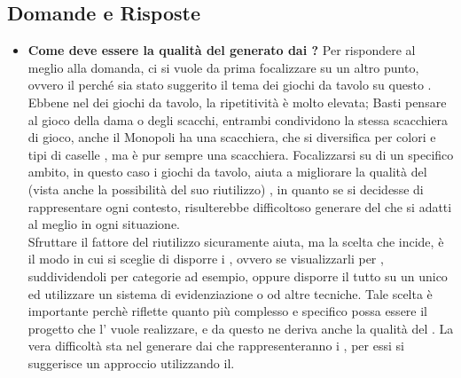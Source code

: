 	  \subsection{Domande e Risposte}
	   \begin{itemize}
	   
	   	\item 
	   		\textbf{Come deve essere la qualità del  generato dai ?}
	    	\justifying     		
Per rispondere al meglio alla domanda, ci si vuole da prima focalizzare su un altro punto, ovvero il perché sia stato suggerito il tema dei giochi da tavolo su questo .\\
Ebbene nel  dei giochi da tavolo, la ripetitività è molto elevata; Basti pensare al gioco della dama o degli scacchi, entrambi condividono la stessa scacchiera di gioco, anche il Monopoli ha una scacchiera, che si diversifica per colori e tipi di caselle , ma è pur sempre una scacchiera. Focalizzarsi su di un specifico ambito, in questo caso i giochi da tavolo, aiuta a migliorare la qualità del  (vista anche la possibilità del suo riutilizzo) , in quanto se si decidesse di rappresentare ogni contesto, risulterebbe difficoltoso generare del  che si adatti al meglio in ogni situazione.\\Sfruttare il fattore del riutilizzo sicuramente aiuta, ma la scelta che incide, è il modo in cui si sceglie di disporre i , ovvero se visualizzarli per  , suddividendoli per categorie ad esempio, oppure disporre il tutto su un unico  ed utilizzare un sistema di evidenziazione o  od altre tecniche. Tale scelta è importante perchè riflette quanto più complesso e specifico possa essere il progetto che l' vuole realizzare, e da questo ne deriva anche la qualità del .
      		La vera difficoltà sta nel generare  dai  che rappresenteranno i , per essi si suggerisce un approccio utilizzando il.\\


\end{itemize}

